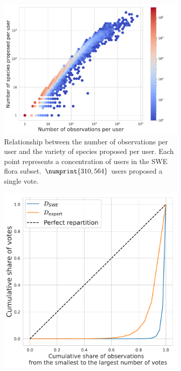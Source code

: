 \begin{figure}[htb]
    \centering
    \begin{subfigure}[t]{.52\textwidth}
        \centering
        \includegraphics[width=\linewidth]{./images_plantnet/obs_species_per_user.pdf}
        \caption{Relationship between the number of observations per user and the variety of species proposed per user. Each point represents a concentration of users in the SWE flora subset. $\numprint{310,564}$ users proposed a single vote.}
        \label{fig:users_obs_species}
    \end{subfigure}%
    \hfill
    \begin{subfigure}[t]{.40\textwidth}
        \centering
        \includegraphics[width=\linewidth]{./images_plantnet/lorenz_curves.pdf}

\end{subfigure}
\end{figure}
